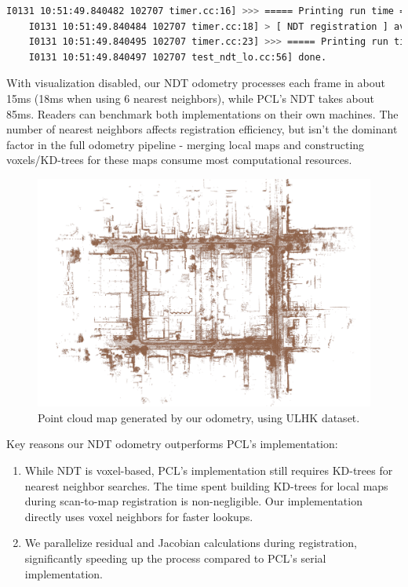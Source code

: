 \begin{lstlisting}[language=sh,caption=Terminal output:]
	I0131 10:51:49.840482 102707 timer.cc:16] >>> ===== Printing run time =====
	I0131 10:51:49.840484 102707 timer.cc:18] > [ NDT registration ] average time usage: 36.349 ms , called times: 3178
	I0131 10:51:49.840495 102707 timer.cc:23] >>> ===== Printing run time end =====
	I0131 10:51:49.840497 102707 test_ndt_lo.cc:56] done.
\end{lstlisting}

With visualization disabled, our NDT odometry processes each frame in about 15ms (18ms when using 6 nearest neighbors), while PCL's NDT takes about 85ms. Readers can benchmark both implementations on their own machines. The number of nearest neighbors affects registration efficiency, but isn't the dominant factor in the full odometry pipeline - merging local maps and constructing voxels/KD-trees for these maps consume most computational resources.

\begin{figure}[!t]
	\centering
	\includegraphics[width=1.0\textwidth]{resources/3d-lidar-mapping/ch7-lo-map}
	\caption{Point cloud map generated by our odometry, using ULHK dataset.}
	\label{fig:lo-map}
\end{figure}

Key reasons our NDT odometry outperforms PCL's implementation:
\begin{enumerate}
	\item While NDT is voxel-based, PCL's implementation still requires KD-trees for nearest neighbor searches. The time spent building KD-trees for local maps during scan-to-map registration is non-negligible. Our implementation directly uses voxel neighbors for faster lookups.
	\item We parallelize residual and Jacobian calculations during registration, significantly speeding up the process compared to PCL's serial implementation.
\end{enumerate}

